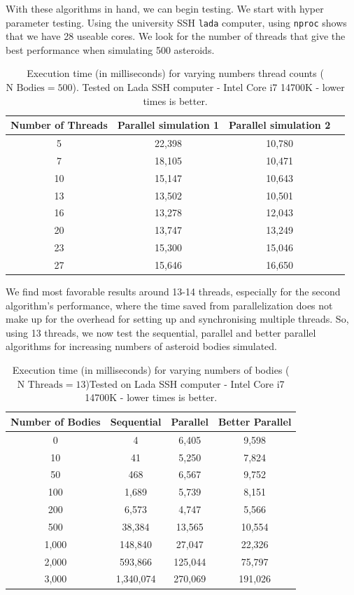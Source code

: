 \documentclass{article}
\begin{document}
With these algorithms in hand, we can begin testing. We start with hyper parameter testing. Using the university SSH \texttt{lada} computer, using \texttt{nproc} shows that we have 28 useable cores. We look for the number of threads that give the best performance when simulating 500 asteroids.

\begin{table}[htbp]
\centering
\begin{tabular}{|c|c|c|c|}
\hline
\textbf{Number of Threads} & \textbf{Parallel simulation 1} & \textbf{Parallel simulation 2} \\
\hline
5     & 22,398  & 10,780       \\
7     & 18,105  & 10,471    \\
10    & 15,147  & 10,643   \\
13    & 13,502  & 10,501   \\
16    & 13,278  & 12,043   \\
20    & 13,747  & 13,249   \\
23    & 15,300  & 15,046  \\
27    & 15,646  & 16,650 \\
\hline
\end{tabular}
\caption{Execution time (in milliseconds) for varying numbers thread counts ($\text{N Bodies} = 500$). Tested on Lada SSH computer - Intel Core i7 14700K - lower times is better.}
\label{tab:thread_performance}
\end{table}

We find most favorable results around 13-14 threads, especially for the second algorithm's performance, where the time saved from parallelization does not make up for the overhead for setting up and synchronising multiple threads. So, using 13 threads, we now test the sequential, parallel and better parallel algorithms for increasing numbers of asteroid bodies simulated.

\begin{table}[htbp]
\centering
\begin{tabular}{|c|c|c|c|}
\hline
\textbf{Number of Bodies} & \textbf{Sequential} & \textbf{Parallel} & \textbf{Better Parallel} \\
\hline
0     & 4  & 6,405    & 9,598     \\
10     & 41  & 5,250  & 7,824   \\
50    & 468  & 6,567  & 9,752   \\
100   & 1,689  & 5,739  & 8,151   \\
200 & 6,573 & 4,747 & 5,566 \\ 
500 & 38,384 & 13,565 & 10,554 \\
1,000  &  148,840 & 27,047  &  22,326  \\
2,000 & 593,866 & 125,044 & 75,797 \\
3,000 & 1,340,074 & 270,069 & 191,026 \\
\hline
\end{tabular}
\caption{Execution time (in milliseconds) for varying numbers of bodies ($\text{N Threads} = 13$)Tested on Lada SSH computer - Intel Core i7 14700K - lower times is better.}
\label{tab:thread_performance}
\end{table}
\end{document}
